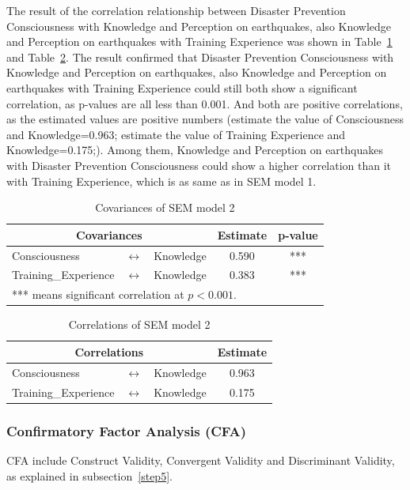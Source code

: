 The result of the correlation relationship between Disaster Prevention Consciousness with Knowledge and Perception on earthquakes, also Knowledge and Perception on earthquakes with Training Experience was shown in Table~\ref{table21} and Table~\ref{table22}. The result confirmed that Disaster Prevention Consciousness with Knowledge and Perception on earthquakes, also Knowledge and Perception on earthquakes with Training Experience could still both show a significant correlation, as p-values are all less than 0.001. And both are positive correlations, as the estimated values are positive numbers (estimate the value of Consciousness and Knowledge=0.963; estimate the value of Training Experience and Knowledge=0.175;). Among them, Knowledge and Perception on earthquakes with Disaster Prevention Consciousness could show a higher correlation than it with Training Experience, which is as same as in SEM model 1.

\begin{table}[h]
  \caption{Covariances of SEM model 2}
  \label{table21}
  \centering
  \begin{tabular}{lcl|c|c}
  \hline
   \multicolumn{3}{c|}{Covariances} & Estimate & p-value \\
  \hline
  Consciousness & $\longleftrightarrow$ & Knowledge & 0.590 & *** \\
  Training\_Experience & $\longleftrightarrow$ & Knowledge & 0.383 & *** \\
  \hline
\multicolumn{5}{l}{*** means significant correlation at $p<0.001$.}
  \end{tabular}
\end{table}

\begin{table}[h]
  \caption{Correlations of SEM model 2}
  \label{table22}
  \centering
  \begin{tabular}{lcl|c}
  \hline
   \multicolumn{3}{c|}{Correlations} & Estimate \\
  \hline
  Consciousness & $\longleftrightarrow$ & Knowledge & 0.963 \\
  Training\_Experience & $\longleftrightarrow$ & Knowledge & 0.175 \\
  \hline
  \end{tabular}
\end{table}
\cleardoublepage
\subsubsection{Confirmatory Factor Analysis (CFA)}
CFA include Construct Validity, Convergent Validity and Discriminant Validity, as explained in subsection~\ref{step5}.

